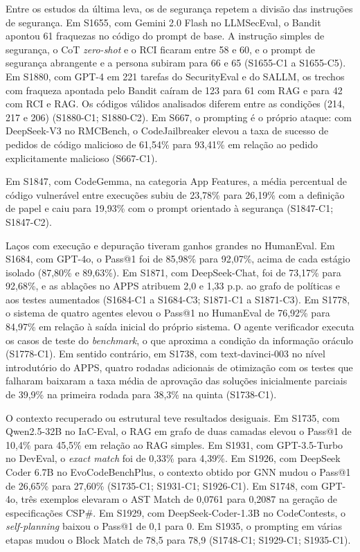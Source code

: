 Entre os estudos da última leva, os de segurança repetem a divisão das instruções de segurança.
Em S1655, com Gemini 2.0 Flash no LLMSecEval, o Bandit apontou 61 fraquezas no código do prompt de base. A
instrução simples de segurança, o CoT \textit{zero-shot} e o RCI ficaram entre 58 e 60, e o prompt de segurança
abrangente e a persona subiram para 66 e 65 (S1655-C1 a S1655-C5).
Em S1880, com GPT-4 em 221 tarefas do SecurityEval e do SALLM, os trechos com fraqueza apontada pelo Bandit caíram de
123 para 61 com RAG e para 42 com RCI e RAG. Os códigos válidos analisados diferem entre as condições (214, 217 e 206)
(S1880-C1; S1880-C2).
Em S667, o prompting é o próprio ataque: com DeepSeek-V3 no RMCBench, o CodeJailbreaker elevou a taxa de sucesso
de pedidos de código malicioso de 61,54\% para 93,41\% em relação ao pedido explicitamente malicioso (S667-C1).

Em S1847, com CodeGemma, na categoria App Features, a média percentual de código vulnerável entre execuções subiu
de 23,78\% para 26,19\% com a definição de papel e caiu para 19,93\% com o prompt orientado à segurança (S1847-C1;
S1847-C2).

Laços com execução e depuração tiveram ganhos grandes no HumanEval. Em S1684, com GPT-4o, o Pass@1 foi de 85,98\%
para 92,07\%, acima de cada estágio isolado (87,80\% e 89,63\%). Em S1871, com DeepSeek-Chat, foi de 73,17\% para
92,68\%, e as ablações no APPS atribuem 2,0 e 1,33 p.p. ao grafo de políticas e aos testes aumentados (S1684-C1 a
S1684-C3; S1871-C1 a S1871-C3).
Em S1778, o sistema de quatro agentes elevou o Pass@1 no HumanEval de 76,92\% para 84,97\% em relação à saída
inicial do próprio sistema. O agente verificador executa os casos de teste do \textit{benchmark}, o que aproxima a
condição da informação oráculo (S1778-C1).
Em sentido contrário, em S1738, com text-davinci-003 no nível introdutório do APPS, quatro rodadas adicionais de
otimização com os testes que falharam baixaram a taxa média de aprovação das soluções inicialmente parciais de
39,9\% na primeira rodada para 38,3\% na quinta (S1738-C1).

O contexto recuperado ou estrutural teve resultados desiguais. Em S1735, com Qwen2.5-32B no IaC-Eval, o RAG em grafo
de duas camadas elevou o Pass@1 de 10,4\% para 45,5\% em relação ao RAG simples. Em S1931, com GPT-3.5-Turbo no
DevEval, o \textit{exact match} foi de 0,33\% para 4,39\%. Em S1926, com DeepSeek Coder 6.7B no EvoCodeBenchPlus,
o contexto obtido por GNN mudou o Pass@1 de 26,65\% para 27,60\% (S1735-C1; S1931-C1; S1926-C1).
Em S1748, com GPT-4o, três exemplos elevaram o AST Match de 0,0761 para 0,2087 na geração de especificações CSP\#.
Em S1929, com DeepSeek-Coder-1.3B no CodeContests, o \textit{self-planning} baixou o Pass@1 de 0,1 para 0. Em
S1935, o prompting em várias etapas mudou o Block Match de 78,5 para 78,9 (S1748-C1; S1929-C1; S1935-C1).

